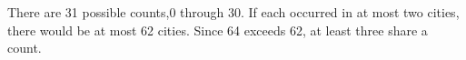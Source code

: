 There are 31 possible counts,0 through 30. If each occurred in at most two cities, there would be at most 62 cities. Since 64 exceeds 62, at least three share a count.
